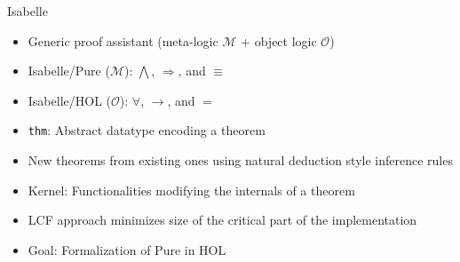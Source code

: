\begin{frame}{Isabelle}
  \begin{itemize}[<+->]
  	\item Generic proof assistant (meta-logic $\mathcal{M}$ + object logic $\mathcal{O}$)
    \item Isabelle/Pure ($\mathcal{M}$): $\bigwedge$, $\Longrightarrow$, and $\equiv$
    \item Isabelle/HOL ($\mathcal{O}$): $\forall$, $\longrightarrow$, and $=$

    \item \texttt{thm}: Abstract datatype encoding a theorem
    \item New theorems from existing ones using natural deduction style inference rules
    \item Kernel: Functionalities modifying the internals of a theorem
    \item LCF approach minimizes size of the critical part of the implementation
    \item Goal: Formalization of Pure in HOL
  \end{itemize}
\end{frame}
